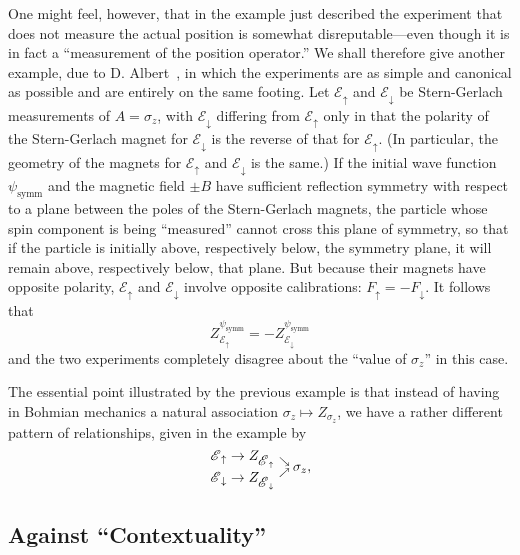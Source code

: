 \documentclass[12pt]{article}
\newcommand{\BM}{Bohmian mechanics}
\newcommand{\wf}{wave function}
\newcommand{\E}{\mbox{$\mathscr{E}$}}
\begin{document}
One might feel, however, that in the example just described the
experiment that does not measure the actual position is somewhat
disreputable---even though it is in fact a ``measurement of the
position operator.''  We shall therefore give another example, due to
D. Albert~\cite{albert}, in which the experiments are as simple and
canonical as possible and are entirely on the same footing.  Let
$\E_{\uparrow}$ and $\E_{\downarrow}$ be Stern-Gerlach measurements of
$A=\sigma_z$, with $\E_{\downarrow}$ differing {}from $\E_{\uparrow}$
only in that the polarity of the Stern-Gerlach magnet for
$\E_{\downarrow}$ is the reverse of that for $\E_{\uparrow}$. (In
particular, the geometry of the magnets for $\E_{\uparrow}$ and
$\E_{\downarrow}$ is the same.)  If the initial \wf{}
$\psi_{\text{symm}}$ and the magnetic field $\pm B$ have sufficient
reflection symmetry with respect to a plane between the poles of the
Stern-Gerlach magnets, the particle whose spin component is being
``measured'' cannot cross this plane of symmetry, so that if the
particle is initially above, respectively below, the symmetry plane,
it will remain above, respectively below, that plane. But because
their magnets have opposite polarity, $\E_{\uparrow}$ and
$\E_{\downarrow}$ involve opposite calibrations: $F_{\uparrow}=
-F_{\downarrow}$. It follows that
$$
Z^{\psi_{\text{symm}}}_{\E_{\uparrow}}= -
Z^{\psi_{\text{symm}}}_{\E_{\downarrow}}
$$
and the two experiments completely disagree about the ``value of
$\sigma_z$'' in this case.

The essential point illustrated by the previous example is that
instead of having in \BM{} a natural association
$\sigma_z\mapsto{}Z_{\sigma_z}$, we have a rather different pattern of
relationships, given in the example by
$$
\genfrac{}{}{0pt}{}{\E_{\uparrow}
   \to{Z_{\E_{\uparrow}}}}{\E_{\downarrow} \to
   {Z_{\E_{\downarrow}}}}\,^{\searrow}_\nearrow\, \sigma_z,$$




\subsection{Against ``Contextuality''}\label{sec:agcontext}
\end{document}
